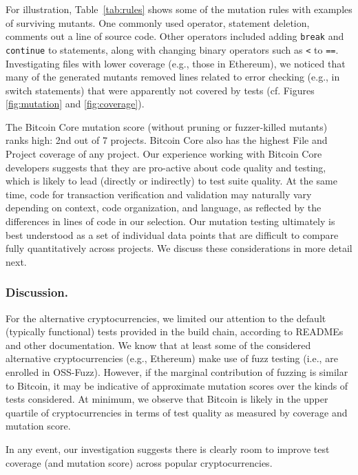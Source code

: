 For illustration, Table~\ref{tab:rules} shows some of the mutation rules
with examples of surviving mutants. One commonly used operator,
statement deletion, comments out a
line of source code.
Other operators included adding {\tt break} and {\tt continue} to statements,
along with changing binary operators such as \texttt{<} to \texttt{==}.
Investigating files with lower coverage (e.g., those in Ethereum), we noticed
that many of the generated mutants removed lines related to error checking
(e.g., in switch statements) that were apparently not covered by tests (cf.
Figures \ref{fig:mutation} and \ref{fig:coverage}).

The Bitcoin Core mutation score (without pruning or fuzzer-killed
mutants) ranks high: 2nd out of 7 projects. Bitcoin Core
also has the highest File and Project coverage of any project.  Our experience
working with Bitcoin Core developers suggests that they are pro-active about code
quality and testing, which is likely to lead (directly or
indirectly) to test suite quality.
At the same time, code
for transaction verification and validation may naturally vary depending on
context, code organization, and language, as reflected by the differences in
lines of code in our selection. Our mutation testing
ultimately is best understood as a set of individual data points that are
difficult to compare fully quantitatively across projects.  We discuss these
considerations in more detail next.

%

\subsubsection*{Discussion.}
For the alternative cryptocurrencies, we limited our attention to the default
(typically functional) tests provided in the build chain, according to READMEs
and other documentation.  We know that at least some of the considered
alternative cryptocurrencies (e.g., Ethereum) make use of fuzz testing (i.e., are
enrolled in OSS-Fuzz).  However, if the marginal contribution of fuzzing is
similar to Bitcoin, it may be indicative of approximate
mutation scores over the kinds of tests considered.  At minimum, we observe that
Bitcoin is likely in the upper quartile of cryptocurrencies in terms of test
quality as measured by coverage and mutation score.

In any event, our investigation suggests there is clearly
room to improve test coverage (and mutation score) across popular
cryptocurrencies.

